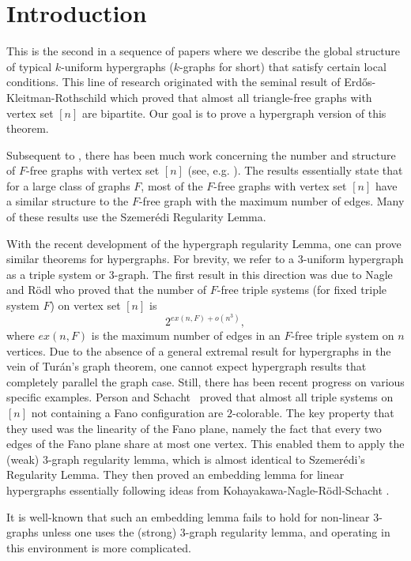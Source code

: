 \documentclass[11pt]{article}
\begin{document}
\section{Introduction}

This is the second in a sequence of papers where we describe the global structure of typical $k$-uniform hypergraphs
($k$-graphs for short) that satisfy certain local conditions. This line of research originated with the seminal result of
 Erd\H os-Kleitman-Rothschild \cite{EKR} which proved that almost all triangle-free graphs with vertex set $[n]$ are bipartite.
  Our goal is to prove a hypergraph version of this theorem.

Subsequent to  \cite{EKR},
there has been much work concerning the number and structure of
$F$-free graphs with vertex set $[n]$ (see, e.g. \cite{EFR, KPR,
PS1, BBS1, BBS2, BBS3}). The results essentially state that for a
large class of graphs $F$, most of the $F$-free graphs with vertex
set $[n]$ have a similar structure to the $F$-free graph with the
maximum number of edges. Many of these results use  the Szemer\'edi
Regularity Lemma.

With the recent development of the hypergraph regularity Lemma, one can prove similar theorems for hypergraphs.
 For brevity, we refer to a $3$-uniform hypergraph as a triple system or 3-graph.
 The first result in this direction was due to Nagle and R\"odl \cite{NR} who proved that the
  number of $F$-free triple systems (for fixed triple system $F$) on vertex set $[n]$ is
$$2^{ex(n, F) + o(n^3)},$$
where $ex(n,F)$ is the maximum number of edges in an $F$-free triple
system on $n$ vertices.
 Due to the absence of a general extremal result for hypergraphs in the vein of Tur\'an's graph theorem,
  one cannot expect hypergraph results that completely parallel the graph case. Still, there has been recent progress on various specific examples. Person and Schacht~\cite{PSch} proved that almost all
   triple systems on $[n]$ not containing a Fano configuration are $2$-colorable.
   The key property that they used was the linearity of the Fano plane,
   namely the fact that every two edges of the Fano plane share at most one vertex.
   This enabled them to apply the (weak) $3$-graph regularity lemma, which is almost
   identical to Szemer\'edi's Regularity Lemma.  They then proved an embedding lemma for linear
    hypergraphs essentially following ideas from Kohayakawa-Nagle-R\"odl-Schacht \cite{KNRS}.

It is well-known that such an embedding lemma fails to hold for
non-linear $3$-graphs unless one uses the (strong) $3$-graph
regularity lemma, and operating in this environment is more
complicated.
\end{document}
